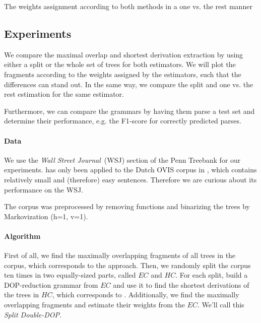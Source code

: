\begin{table}[h!]
\center

\caption{The weights assignment according to both methods in a one vs. the rest manner}
\label{t:weights}
\end{table}





\subsection{Experiments}





We compare the maximal overlap and shortest derivation extraction by using either a split or the whole set of trees for both estimators. We will plot the fragments according to the weights assigned by the estimators, such that the differences can stand out. In the same way, we compare the split and one vs. the rest estimation for the same estimator.

Furthermore, we can compare the grammars by having them parse a test set and determine their performance, e.g. the F1-score for correctly predicted parses.

\paragraph{Data}
We use the \emph{Wall Street Journal}~(WSJ) section of the Penn Treebank for our experiments. \dops{} has only been applied to the Dutch OVIS corpus in \cite{zollmann2005}, which contains relatively small and (therefore) easy sentences. Therefore we are curious about its performance on the WSJ.

The corpus was preprocessed by removing functions and binarizing the trees by Markovization (h=1, v=1). 

\paragraph{Algorithm}
First of all, we find the maximally overlapping fragments of all trees in the corpus, which corresponds to the \ddop{} approach.
Then, we randomly split the corpus ten times in two equally-sized parts, called $EC$ and $HC$. For each split, build a DOP-reduction grammar from $EC$ and use it to find the shortest derivations of the trees in $HC$, which corresponds to \dops{}. Additionally, we find the maximally overlapping fragments and estimate their weights from the $EC$. We'll call this \emph{Split Double-DOP}.


